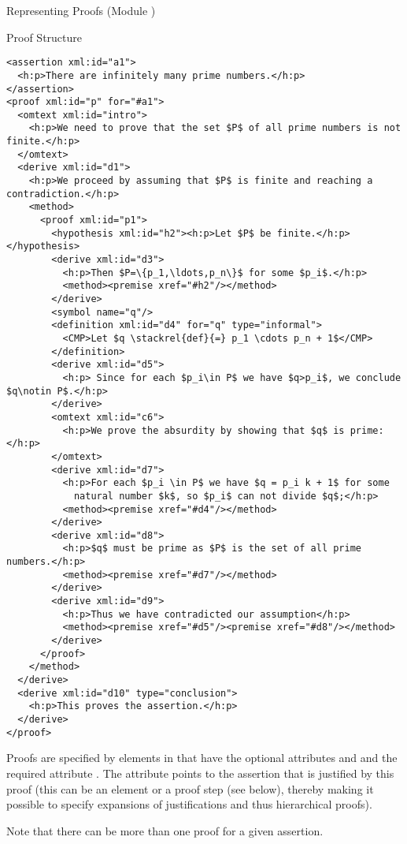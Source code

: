 \begin{omgroup}[id=proofs,short=Representing Proofs]{Representing Proofs (Module {})}
\begin{module}[id=proof-structure]
\begin{omgroup}[id=proof-text]{Proof Structure}
\begin{lstlisting}[label=lst:primes-omdoc-text,mathescape,
  caption={An {\omdoc} Representation of {\myfigref{pf-example1-math}}.},
  index={symbol,definition}]
<assertion xml:id="a1">
  <h:p>There are infinitely many prime numbers.</h:p>
</assertion>
<proof xml:id="p" for="#a1">
  <omtext xml:id="intro">
    <h:p>We need to prove that the set $P$ of all prime numbers is not finite.</h:p>
  </omtext>
  <derive xml:id="d1">
    <h:p>We proceed by assuming that $P$ is finite and reaching a contradiction.</h:p>
    <method>
      <proof xml:id="p1">
        <hypothesis xml:id="h2"><h:p>Let $P$ be finite.</h:p></hypothesis>
        <derive xml:id="d3">
          <h:p>Then $P=\{p_1,\ldots,p_n\}$ for some $p_i$.</h:p>
          <method><premise xref="#h2"/></method>
        </derive>
        <symbol name="q"/>
        <definition xml:id="d4" for="q" type="informal">
          <CMP>Let $q \stackrel{def}{=} p_1 \cdots p_n + 1$</CMP>
        </definition>
        <derive xml:id="d5">
          <h:p> Since for each $p_i\in P$ we have $q>p_i$, we conclude $q\notin P$.</h:p>
        </derive>  
        <omtext xml:id="c6">
          <h:p>We prove the absurdity by showing that $q$ is prime:</h:p>
        </omtext>  
        <derive xml:id="d7">
          <h:p>For each $p_i \in P$ we have $q = p_i k + 1$ for some
            natural number $k$, so $p_i$ can not divide $q$;</h:p>
          <method><premise xref="#d4"/></method>
        </derive>
        <derive xml:id="d8">
          <h:p>$q$ must be prime as $P$ is the set of all prime numbers.</h:p> 
          <method><premise xref="#d7"/></method>
        </derive>
        <derive xml:id="d9">
          <h:p>Thus we have contradicted our assumption</h:p>
          <method><premise xref="#d5"/><premise xref="#d8"/></method>
        </derive>  
      </proof>
    </method>
  </derive>  
  <derive xml:id="d10" type="conclusion">
    <h:p>This proves the assertion.</h:p>
  </derive>  
</proof>
\end{lstlisting}
\begin{definition}[id=proof.def]
  Proofs are specified by {} elements in {\omdoc} that have the optional
  attributes {} and {} and the
  required attribute {}. The {} attribute
  points to the assertion that is justified by this proof (this can be an
  {} element or a {} proof step (see below), thereby
  making it possible to specify expansions of justifications and thus hierarchical
  proofs).
\end{definition}
Note that there can be more than one proof for a given assertion.


\end{omgroup}
\end{module}
\end{omgroup}
